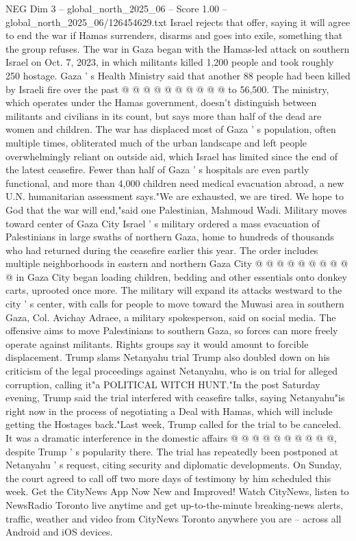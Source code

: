 \begin{textsample}{NEG Dim 3 – global\_north\_2025\_06 – Score 1.00 – global\_north\_2025\_06/126454629.txt}
Israel rejects that offer, saying it will agree to end the war if Hamas surrenders, disarms and goes into exile, something that the group refuses.
The war in Gaza began with the Hamas-led attack on southern Israel on Oct. 7, 2023, in which militants killed 1,200 people and took roughly 250 hostage.
Gaza ' s Health Ministry said that another 88 people had been killed by Israeli fire over the past @ @ @ @ @ @ @ @ @ @ to 56,500.
The ministry, which operates under the Hamas government, doesn't distinguish between militants and civilians in its count, but says more than half of the dead are women and children.
The war has displaced most of Gaza ' s population, often multiple times, obliterated much of the urban landscape and left people overwhelmingly reliant on outside aid, which Israel has limited since the end of the latest ceasefire.
Fewer than half of Gaza ' s hospitals are even partly functional, and more than 4,000 children need medical evacuation abroad, a new U.N. humanitarian assessment says."We are exhausted, we are tired.
We hope to God that the war will end,"said one Palestinian, Mahmoud Wadi.
Military moves toward center of Gaza City Israel ' s military ordered a mass evacuation of Palestinians in large swaths of northern Gaza, home to hundreds of thousands who had returned during the ceasefire earlier this year.
The order includes multiple neighborhoods in eastern and northern Gaza City @ @ @ @ @ @ @ @ @ @ in Gaza City began loading children, bedding and other essentials onto donkey carts, uprooted once more.
The military will expand its attacks westward to the city ' s center, with calls for people to move toward the Muwasi area in southern Gaza, Col.
Avichay Adraee, a military spokesperson, said on social media.
The offensive aims to move Palestinians to southern Gaza, so forces can more freely operate against militants.
Rights groups say it would amount to forcible displacement.
Trump slams Netanyahu trial Trump also doubled down on his criticism of the legal proceedings against Netanyahu, who is on trial for alleged corruption, calling it"a POLITICAL WITCH HUNT."In the post Saturday evening, Trump said the trial interfered with ceasefire talks, saying Netanyahu"is right now in the process of negotiating a Deal with Hamas, which will include getting the Hostages back."Last week, Trump called for the trial to be canceled.
It was a dramatic interference in the domestic affairs @ @ @ @ @ @ @ @ @ @, despite Trump ' s popularity there.
The trial has repeatedly been postponed at Netanyahu ' s request, citing security and diplomatic developments.
On Sunday, the court agreed to call off two more days of testimony by him scheduled this week.
Get the CityNews App Now New and Improved!
Watch CityNews, listen to NewsRadio Toronto live anytime and get up-to-the-minute breaking-news alerts, traffic, weather and video from CityNews Toronto anywhere you are -- across all Android and iOS devices.

\end{textsample}
